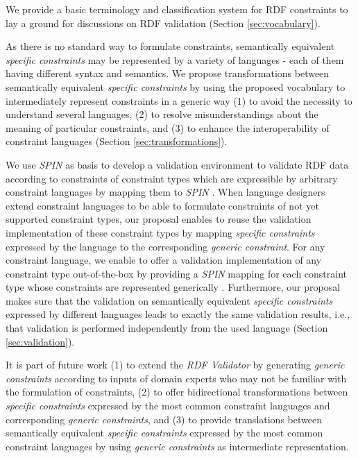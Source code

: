 \documentclass[a4paper,fontsize=11pt]{scrartcl}
\begin{document}
We provide a basic terminology and classification system for RDF constraints to lay a ground for discussions on RDF validation (Section \ref{sec:vocabulary}).

As there is no standard way to formulate constraints, 
semantically equivalent \emph{specific constraints} may be represented by a variety of languages - each of them having different syntax and semantics.
We propose transformations between semantically equivalent \emph{specific constraints}
by using the proposed vocabulary to intermediately represent constraints in a generic way
(1) to avoid the necessity to understand several languages,
(2) to resolve misunderstandings about the meaning of particular constraints, and
(3) to enhance the interoperability of constraint languages (Section \ref{sec:transformations}).

We use \emph{SPIN} as basis to develop a validation environment to validate RDF data according to constraints of constraint types which are expressible by arbitrary constraint languages by mapping them to \emph{SPIN} \cite{BoschEckert2014-2}.
When language designers extend constraint languages 
to be able to formulate constraints of not yet supported constraint types,
our proposal enables to reuse the validation implementation of these constraint types 
by mapping \emph{specific constraints} expressed by the language to the corresponding \emph{generic constraint}.
For any constraint language, we enable to offer a validation implementation of any constraint type out-of-the-box
by providing a \emph{SPIN} mapping
for each constraint type  
whose constraints are represented generically \cite{BoschEckert2015-2}. 
Furthermore, our proposal makes sure that the validation on semantically equivalent \emph{specific constraints} expressed by different languages
leads to exactly the same validation results, 
i.e., that validation is performed independently from the used language (Section \ref{sec:validation}).

It is part of future work 
(1) to extend the \emph{RDF Validator} by generating \emph{generic constraints} according to inputs of domain experts who may not be familiar with the formulation of constraints,
(2) to offer bidirectional transformations between \emph{specific constraints} expressed by the most common constraint languages and corresponding \emph{generic constraints}, and
(3) to provide translations between semantically equivalent \emph{specific constraints} expressed by the most common constraint languages by using \emph{generic constraints} as intermediate representation.
\end{document}
